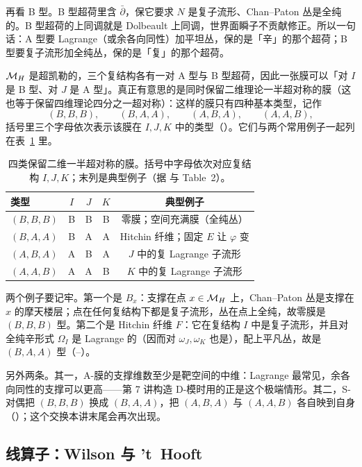 再看 B 型。B 型超荷里含 $\bar\partial$，保它要求 $N$ 是复子流形、Chan--Paton 丛是全纯的。B 型超荷的上同调就是 Dolbeault 上同调，世界面瞬子不贡献修正。所以一句话：A 型要 Lagrange（或余各向同性）加平坦丛，保的是「辛」的那个超荷；B 型要复子流形加全纯丛，保的是「复」的那个超荷。

$\mathcal{M}_{H}$ 是超凯勒的，三个复结构各有一对 A 型与 B 型超荷，因此一张膜可以「对 $I$ 是 B 型、对 $J$ 是 A 型」。真正有意思的是同时保留二维理论一半超对称的膜（这也等于保留四维理论四分之一超对称）：这样的膜只有四种基本类型，记作
\[
(B,B,B),\qquad (B,A,A),\qquad (A,B,A),\qquad (A,A,B),
\]
括号里三个字母依次表示该膜在 $I,J,K$ 中的类型（）。它们与两个常用例子一起列在表~\ref{tab:brane-types} 里。

\begin{table}[htbp]
\centering
\small
\caption{四类保留二维一半超对称的膜。括号中字母依次对应复结构 $I,J,K$；末列是典型例子（据  与  Table~2）。}
\label{tab:brane-types}
\begin{tabular}{@{}lcccc@{}}
\toprule
类型 & $I$ & $J$ & $K$ & 典型例子 \\
\midrule
$(B,B,B)$ & B & B & B & 零膜；空间充满膜（全纯丛） \\
$(B,A,A)$ & B & A & A & Hitchin 纤维；固定 $E$ 让 $\varphi$ 变 \\
$(A,B,A)$ & A & B & A & $J$ 中的复 Lagrange 子流形 \\
$(A,A,B)$ & A & A & B & $K$ 中的复 Lagrange 子流形 \\
\bottomrule
\end{tabular}
\end{table}

两个例子要记牢。第一个是 $B_x$：支撑在点 $x\in\mathcal{M}_{H}$ 上，Chan--Paton 丛是支撑在 $x$ 的摩天楼层；点在任何复结构下都是复子流形，丛在点上全纯，故零膜是 $(B,B,B)$ 型。第二个是 Hitchin 纤维 $F$：它在复结构 $I$ 中是复子流形，并且对全纯辛形式 $\Omega_I$ 是 Lagrange 的（因而对 $\omega_J,\omega_K$ 也是），配上平凡丛，故是 $(B,A,A)$ 型（--）。

另外两条。其一，A-膜的支撑维数至少是靶空间的中维：Lagrange 最常见，余各向同性的支撑可以更高——第 7 讲构造 D-模时用的正是这个极端情形。其二，S-对偶把 $(B,B,B)$ 换成 $(B,A,A)$，把 $(A,B,A)$ 与 $(A,A,B)$ 各自映到自身（）；这个交换本讲末尾会再次出现。

\subsection{线算子：Wilson 与 't~Hooft}

